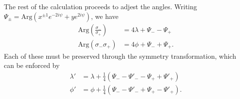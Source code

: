 \documentclass[aps,showpacs,twocolumn,prd,superscriptaddress,nofootinbib]{revtex4}
\begin{document}
The rest of the calculation proceeds to adjest the angles. Writing $\Psi_{\pm}=\mathrm{Arg}(x^{\pm1}e^{-2i\psi}+ye^{2i\psi})$,
we have
\begin{align}
  \mathrm{Arg}(\frac{\sigma_-}{\sigma_+})&=4\lambda+\Psi_--\Psi_+\\
  \mathrm{Arg}({\sigma_-}{\sigma_+})&=4\phi+\Psi_-+\Psi_+.
\end{align}
Each of these must be preserved through the symmetry transformation, which can be enforced by
\begin{align}
  \lambda'&=\lambda+\frac14(\Psi_--\Psi'_--\Psi_++\Psi'_+)\\
  \phi'&=\phi+\frac14(\Psi_--\Psi'_-+\Psi_+-\Psi'_+).
\end{align}
\end{document}
